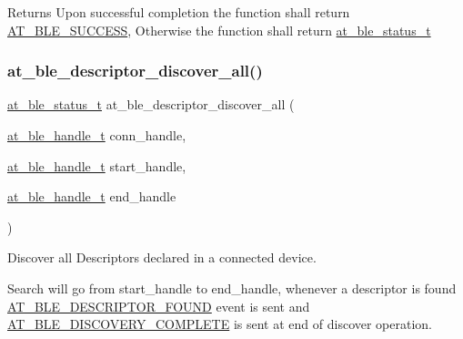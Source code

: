 \begin{DoxyReturn}{Returns}
Upon successful completion the function shall return \mbox{\hyperlink{group__error__codes__group_gga3b1db9b95feb157b3c188ca27fe76988a7e3bfff5387331cd4f2c56cbcbbd7e19}{A\+T\+\_\+\+B\+L\+E\+\_\+\+S\+U\+C\+C\+E\+SS}}, Otherwise the function shall return \mbox{\hyperlink{at__ble__api_8h_ace24eb4e5ca3f325c663b809da5feb92}{at\+\_\+ble\+\_\+status\+\_\+t}} 
\end{DoxyReturn}
\mbox{\label{group__gatt__client__group_gabc3b59303cef6377ee364c7be4f27bb8}} 
\subsubsection{\texorpdfstring{at\_ble\_descriptor\_discover\_all()}{at\_ble\_descriptor\_discover\_all()}}
{\footnotesize\ttfamily \mbox{\hyperlink{group__error__codes__group_ga3b1db9b95feb157b3c188ca27fe76988}{at\+\_\+ble\+\_\+status\+\_\+t}} at\+\_\+ble\+\_\+descriptor\+\_\+discover\+\_\+all (\begin{DoxyParamCaption}\item[{\mbox{\hyperlink{at__ble__api_8h_abd23646d0c662860741f787efc8456f2}{at\+\_\+ble\+\_\+handle\+\_\+t}}}]{conn\+\_\+handle,  }\item[{\mbox{\hyperlink{at__ble__api_8h_abd23646d0c662860741f787efc8456f2}{at\+\_\+ble\+\_\+handle\+\_\+t}}}]{start\+\_\+handle,  }\item[{\mbox{\hyperlink{at__ble__api_8h_abd23646d0c662860741f787efc8456f2}{at\+\_\+ble\+\_\+handle\+\_\+t}}}]{end\+\_\+handle }\end{DoxyParamCaption})}



Discover all Descriptors declared in a connected device. 

Search will go from start\+\_\+handle to end\+\_\+handle, whenever a descriptor is found \mbox{\hyperlink{at__ble__api_8h_a3324640b95f33169515f89738ed5baeba6d2cd50a39d4ba666c653440d01b6b52}{A\+T\+\_\+\+B\+L\+E\+\_\+\+D\+E\+S\+C\+R\+I\+P\+T\+O\+R\+\_\+\+F\+O\+U\+ND}} event is sent and \mbox{\hyperlink{at__ble__api_8h_a3324640b95f33169515f89738ed5baeba8229c390a23c583fa2971431fae60717}{A\+T\+\_\+\+B\+L\+E\+\_\+\+D\+I\+S\+C\+O\+V\+E\+R\+Y\+\_\+\+C\+O\+M\+P\+L\+E\+TE}} is sent at end of discover operation.


